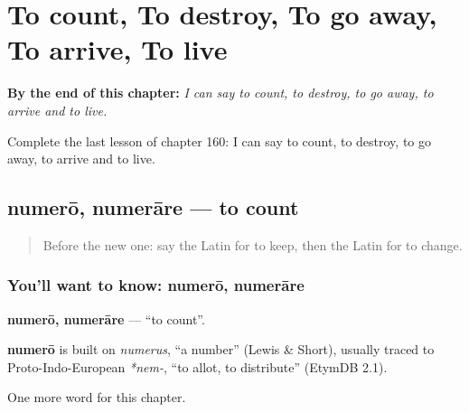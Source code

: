 
\chapter{To count, To destroy, To go away, To arrive, To live}
\label{ch:la-to-count-to-destroy-to-go-away-to-arrive-to-live}

\begin{chapteropening}
\textbf{By the end of this chapter:} \emph{I can say to count, to destroy, to go away, to arrive and to live.}

Complete the last lesson of chapter 160: I can say to count, to destroy, to go away, to arrive and to live.
\end{chapteropening}

\section[numerō, numerāre]{numerō, numerāre — to count}

\label{lesson:LA-C160-numero}



\begin{quote}
Before the new one: say the Latin for to keep, then the Latin for to change.
\end{quote}

\subsection*{You'll want to know: numerō, numerāre}
\textbf{numerō, numerāre} — \textquotedblleft{}to count\textquotedblright{}.

\begin{cousinweb}
\textbf{numerō} is built on \emph{numerus}, \textquotedblleft{}a number\textquotedblright{} (Lewis \& Short), usually traced to Proto-Indo-European \emph{*nem-}, \textquotedblleft{}to allot, to distribute\textquotedblright{} (EtymDB 2.1).
\end{cousinweb}

\begin{grammarlens}[title={What you've built}]
One more word for this chapter.
\end{grammarlens}


